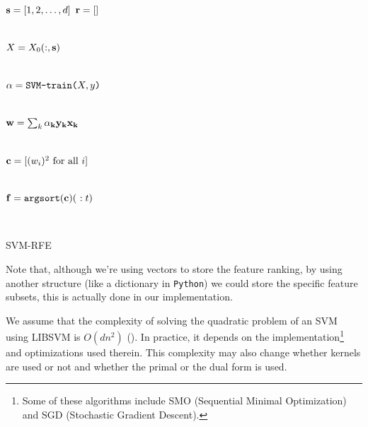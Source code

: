 \begin{algorithm}[h]
    \DontPrintSemicolon
      $\mathbf{s} = [1,2, \dotsc, d]$ 
      $\mathbf{r} = []$  
        {
            \\
            $X=X_0(:,\mathbf{s})$\VS

            \\
            $\mathbf{\alpha} = \texttt{SVM-train(} X, y \texttt{)}$\VS

            \\
            $\mathbf{w} = \sum_k{\mathbf{\alpha_k} \mathbf{y_k} \mathbf{x_k}}$\VS

            \\
            $\mathbf{c} = [(w_i)^2 \text{ for all $i$}]$\VS

            \\
            $\vt{f} = \texttt{argsort}(\vt{c})(\ :t)$\VS

            \\
        }
    \caption{SVM-RFE}
    \label{alg:rfe1}
\end{algorithm}

Note that, although we're using vectors to store the feature ranking, by using another structure (like a dictionary in \texttt{Python}) we could store the specific feature subsets, this is actually done in our implementation. 

We assume that the complexity of solving the quadratic problem of an SVM using LIBSVM is $O(dn^2)$ (\cite{abdiansah_time_2015}). In practice, it depends on the im\-ple\-men\-ta\-tion\footnote{Some of these algorithms include SMO (Sequential Minimal Optimization) and SGD (Stochastic Gradient Descent).} and optimizations used therein. This complexity may also change whether kernels are used or not and whether the primal or the dual form is used. 

